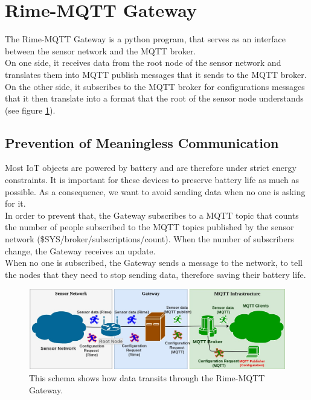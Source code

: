 \documentclass[a4paper,11pt]{article}
\begin{document}
\section{Rime-MQTT Gateway}
The Rime-MQTT Gateway is a python program, that serves as an interface between the sensor network and the MQTT broker.\\

On one side, it receives data from the root node of the sensor network and translates them into MQTT publish messages that it sends to the MQTT broker. On the other side, it subscribes to the MQTT broker for configurations messages that it then translate into a format that the root of the sensor node understands (see figure \ref{fig:communication1}).\\


\subsection{Prevention of Meaningless Communication}
Most IoT objects are powered by battery and are therefore under strict energy constraints. It is important for these devices to preserve battery life as much as possible. As a consequence, we want to avoid sending data when no one is asking for it.\\

In order to prevent that, the Gateway subscribes to a MQTT topic that counts the number of people subscribed to the MQTT topics published by the sensor network (\$SYS/broker/subscriptions/count). When the number of subscribers change, the Gateway receives an update.\\

When no one is subscribed, the Gateway sends a message to the network, to tell the nodes that they need to stop sending data, therefore saving their battery life.

\begin{figure}
  \includegraphics[width=\linewidth]{img/communication-2.jpg}
  \caption{This schema shows how data transits through the Rime-MQTT Gateway.}
  \label{fig:communication1}
\end{figure}
\end{document}
